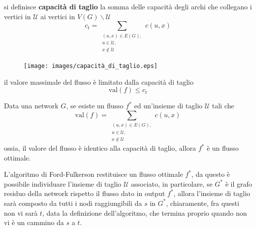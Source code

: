 \documentclass[10pt, letterpaper]{report}
\begin{document}
\begin{definizione}
    si definisce \textbf{capacità di taglio} la somma delle capacità degli archi che collegano i vertici in $\mathcal U$ ai vertici in $V(G)\backslash \mathcal U$
    $$c_t= \sum_{\begin{matrix}
        (u,x)\in E(G),\\u\in \mathcal U,\\ x\notin \mathcal U
    \end{matrix}}c(u,x)$$
\end{definizione}
\begin{figure}[h!]
    \centering 
    \texttt{[image: images/capacità\_di\_taglio.eps]}
\end{figure}
\begin{osservazione}
    il valore massimale del flusso è limitato dalla capacità di taglio 
    $$ \text{val}(f)\le c_t$$
\end{osservazione}
\begin{proposizione} \label{prop:insTaglio}
Data una network $G$, se esiste un flusso $f^*$ ed un'insieme di taglio $\mathcal U$ tali che $$\text{val}(f)= \sum_{\begin{matrix}
    (u,x)\in E(G),\\u\in \mathcal U,\\ x\notin \mathcal U
\end{matrix}}c(u,x)$$
ossia, il valore del flusso è identico alla capacità di taglio, allora $f^*$ è un flusso ottimale.
\end{proposizione}
L'algoritmo di Ford-Fulkerson restituisce un flusso ottimale $f^*$, da questo è possibile individuare l'insieme di taglio $\mathcal U$ associato, in particolare, se $G^*$ è il grafo residuo della network rispetto il flusso dato in output $f^*$, allora l'insieme di taglio sarà composto da tutti i nodi raggiungibili da $s$ in $G^*$, chiaramente, fra questi non vi sarà $t$, data la definizione dell'algoritmo, che termina proprio quando non vi è un cammino da $s$ a $t$.\bigskip 
\end{document}
